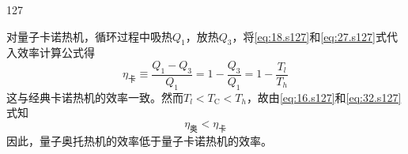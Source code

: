 \begin{solution}{127}
\begin{subsolution}
        对量子卡诺热机，循环过程中吸热$Q _ { 1 }$，放热$Q _ { 3 }$，将\eqref{eq:18.s127}和\eqref{eq:27.s127}式代入效率计算公式得
        \begin{equation}
            \eta_ {\text {卡}} \equiv \frac {Q _ {1} - Q _ {3}}{Q _ {1}} = 1 - \frac {Q _ {3}}{Q _ {1}} = 1 - \frac {T _ {l}}{T _ {h}}
            \label{eq:32.s127}
        \end{equation}
        这与经典卡诺热机的效率一致。然而$T _ { l } < T _ { \mathrm { C } } < T _ { h }$，故由\eqref{eq:16.s127}和\eqref{eq:32.s127}式知
        \begin{equation}
            \eta_ {\text {奥}} < \eta_ {\text {卡}}
            \label{eq:33.s127}
        \end{equation}
        因此，量子奥托热机的效率低于量子卡诺热机的效率。
    \end{subsolution}
\end{solution}